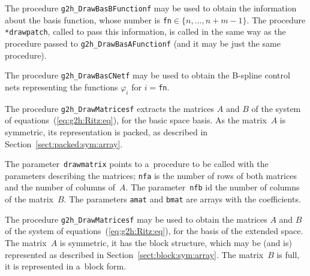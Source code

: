 \vspace{\bigskipamount}
The procedure \texttt{g2h\_DrawBasBFunctionf} may be used to obtain the
information about the basis function, whose number is
\texttt{fn}$\in\{n,\ldots,n+m-1\}$.
The procedure \texttt{*drawpatch}, called to pass this information, is called
in the same way as the procedure passed to \texttt{g2h\_DrawBasAFunctionf} 
(and it may be just the same procedure).

\vspace{\bigskipamount}
The procedure \texttt{g2h\_DrawBasCNetf} may be used to obtain the B-spline
control nets representing the functions $\varphi_i$ for $i=$\texttt{fn}.

\vspace{\bigskipamount}
The procedure \texttt{g2h\_DrawMatricesf} extracts the matrices $A$
and $B$ of the system of equations~(\ref{eq:g2h:Ritz:eq}),
for the basic space basis. As the matrix~$A$ is symmetric,
its representation is packed, as described in
Section~\ref{sect:packed:sym:array}.

The parameter~\texttt{drawmatrix} points to a~procedure to be called
with the parameters describing the matrices; \texttt{nfa} is the number
of rows of both matrices and the number of columns of~$A$.
The parameter~\texttt{nfb} id the number of columns of the matrix~$B$.
The parameters \texttt{amat} and \texttt{bmat}
are arrays with the coefficients.

\vspace{\bigskipamount}
The procedure \texttt{g2h\_DrawMatricesf} may be used to obtain the matrices
$A$ and $B$ of the system of equations~(\ref{eq:g2h:Ritz:eq}),
for the basis of the extended space. The matrix~$A$ is symmetric, it has
the block structure, which may be (and is) represented as described
in Section~\ref{sect:block:sym:array}. The matrix~$B$ is full, it is represented
in a~block form.

